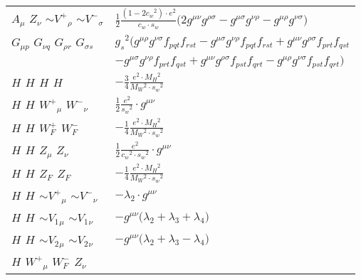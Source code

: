 \begin{center}
\begin{tabular}{|l|l|}
${A}_{\mu }$ \phantom{-} ${Z}_{\nu }$ \phantom{-} $\sim V^+{}_{\rho }$ \phantom{-} $\sim V^-{}_{\sigma }$ \phantom{-}  &
	$\frac{1}{2}\frac{ (1-2 c_w {}^2) \cdot e{}^2 }{ c_w \cdot s_w}\big(2g^{\mu \nu} g^{\rho \sigma} -g^{\mu \sigma} g^{\nu \rho} -g^{\mu \rho} g^{\nu \sigma} \big)$\\[2mm]
${G}_{\mu p }$ \phantom{-} ${G}_{\nu q }$ \phantom{-} ${G}_{\rho r }$ \phantom{-} ${G}_{\sigma s }$ \phantom{-}  &
	$ g_s{}^2 \big(g^{\mu \rho} g^{\nu \sigma} f_{p q t} f_{r s t} -g^{\mu \sigma} g^{\nu \rho} f_{p q t} f_{r s t} +g^{\mu \nu} g^{\rho \sigma} f_{p r t} f_{q s t} $ \\[2mm]
  & $-g^{\mu \sigma} g^{\nu \rho} f_{p r t} f_{q s t} +g^{\mu \nu} g^{\rho \sigma} f_{p s t} f_{q r t} -g^{\mu \rho} g^{\nu \sigma} f_{p s t} f_{q r t} \big)$\\[2mm]
${H}_{}$ \phantom{-} ${H}_{}$ \phantom{-} ${H}_{}$ \phantom{-} ${H}_{}$ \phantom{-}  &
	$-\frac{3}{4}\frac{ e{}^2  \cdot M_H{}^2 }{ M_W{}^2  \cdot s_w{}^2 }$\\[2mm]
${H}_{}$ \phantom{-} ${H}_{}$ \phantom{-} $W^+{}_{\mu }$ \phantom{-} $W^-{}_{\nu }$ \phantom{-}  &
	$\frac{1}{2}\frac{ e{}^2 }{ s_w{}^2 }\cdot g^{\mu \nu} $\\[2mm]
${H}_{}$ \phantom{-} ${H}_{}$ \phantom{-} $W^+_F{}_{}$ \phantom{-} $W^-_F{}_{}$ \phantom{-}  &
	$-\frac{1}{4}\frac{ e{}^2  \cdot M_H{}^2 }{ M_W{}^2  \cdot s_w{}^2 }$\\[2mm]
${H}_{}$ \phantom{-} ${H}_{}$ \phantom{-} ${Z}_{\mu }$ \phantom{-} ${Z}_{\nu }$ \phantom{-}  &
	$\frac{1}{2}\frac{ e{}^2 }{ c_w{}^2  \cdot s_w{}^2 }\cdot g^{\mu \nu} $\\[2mm]
${H}_{}$ \phantom{-} ${H}_{}$ \phantom{-} $Z_F{}_{}$ \phantom{-} $Z_F{}_{}$ \phantom{-}  &
	$-\frac{1}{4}\frac{ e{}^2  \cdot M_H{}^2 }{ M_W{}^2  \cdot s_w{}^2 }$\\[2mm]
${H}_{}$ \phantom{-} ${H}_{}$ \phantom{-} $\sim V^+{}_{\mu }$ \phantom{-} $\sim V^-{}_{\nu }$ \phantom{-}  &
	$- \lambda_2\cdot g^{\mu \nu} $\\[2mm]
${H}_{}$ \phantom{-} ${H}_{}$ \phantom{-} $\sim V_1{}_{\mu }$ \phantom{-} $\sim V_1{}_{\nu }$ \phantom{-}  &
	$-g^{\mu \nu} \big( \lambda_2+ \lambda_3+ \lambda_4\big)$\\[2mm]
${H}_{}$ \phantom{-} ${H}_{}$ \phantom{-} $\sim V_2{}_{\mu }$ \phantom{-} $\sim V_2{}_{\nu }$ \phantom{-}  &
	$-g^{\mu \nu} \big( \lambda_2+ \lambda_3- \lambda_4\big)$\\[2mm]
${H}_{}$ \phantom{-} $W^+{}_{\mu }$ \phantom{-} $W^-_F{}_{}$ \phantom{-} ${Z}_{\nu }$ \phantom{-}  &

\end{tabular}
\end{center}
